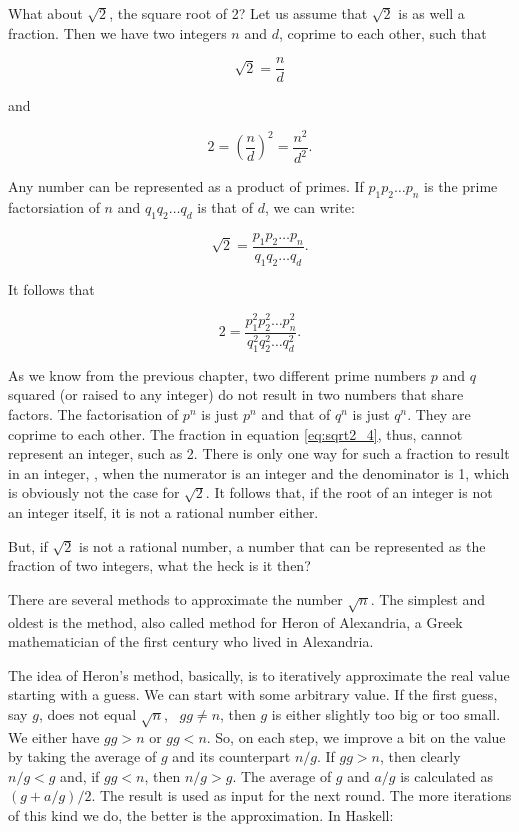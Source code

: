 \documentclass[tikz]{scrreprt}
\begin{document}
What about $\sqrt{2}$, the square root of 2?
Let us assume that $\sqrt{2}$ is as well a fraction.
Then we have two integers $n$ and $d$,
coprime to each other, such that

\begin{equation}
\sqrt{2} = \frac{n}{d}
\end{equation}

and

\begin{equation}
2 = \left(\frac{n}{d}\right)^2 = \frac{n^2}{d^2}.
\end{equation}

Any number can be represented as a product of primes.
If $p_1p_2\dots p_n$ is the prime factorsiation of $n$
and $q_1q_2\dots q_d$ is that of $d$,
we can write:

\begin{equation}
\sqrt{2} = \frac{p_1p_2\dots p_n}{q_1q_2\dots q_d}.
\end{equation}

It follows that 

\begin{equation}\label{eq:sqrt2_4}
2 = \frac{p_1^2p_2^2\dots p_n^2}{q_1^2q_2^2\dots q_d^2}.
\end{equation}

As we know from the previous chapter,
two different prime numbers $p$ and $q$ squared 
(or raised to any integer)
do not result in two numbers that share factors.
The factorisation of $p^n$ is just $p^n$ and that
of $q^n$ is just $q^n$. They are coprime to each other.
The fraction in equation \ref{eq:sqrt2_4}, thus,
cannot represent an integer, such as 2.
There is only one way for such a fraction to
result in an integer, \viz, 
when the numerator is an integer and the denominator is 1,
which is obviously not the case for $\sqrt{2}$.
It follows that, if the root of an integer is not an integer itself,
it is not a rational number either.

But, if $\sqrt{2}$ is not a rational number,
a number that can be represented as the fraction
of two integers, what the heck is it then?

There are several methods to approximate the number $\sqrt{n}$.
The simplest and oldest is the  method,
also called  method for Heron of Alexandria,
a Greek mathematician of the first century who lived in 
Alexandria.

The idea of Heron's method, basically, is to
iteratively approximate the real value starting with a guess.
We can start with some arbitrary value.
If the first guess, say $g$, does not equal $\sqrt{n}$, 
\ie\ $gg \neq n$, then $g$
is either slightly too big or too small.
We either have $gg > n$ or $gg < n$.
So, on each step, we improve a bit on the value
by taking the average of $g$ and its counterpart $n/g$.
If $gg > n$, then clearly $n/g < g$ and, 
if $gg < n$, then $n/g > g$.
The average of $g$ and $a/g$ is calculated as
$(g+a/g)/2$. The result is used as input for the next round.
The more iterations of this kind we do,
the better is the approximation. In Haskell:
\end{document}
